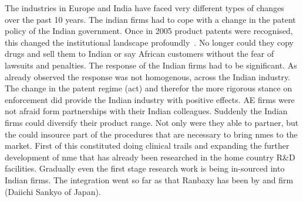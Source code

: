 The \pharma industries in Europe and India have faced very different types of changes over the past 10 years.
The indian firms had to cope with a change in the patent policy of the Indian government.
Once in 2005 product patents were recognised, this changed the institutional landscape profoundly~\citep{Westney:2005vv,Scott:2008tk}.
No longer could they copy drugs and sell them to Indian or say African customers without the fear of lawsuits and penalties.
The response of the Indian firms had to be significant.
As already observed the response was not homogenous, across the Indian industry.
The change in the patent regime (act) and therefor the more rigorous stance on  enforcement did provide the Indian \pharma industry with positive effects.
\Glsdesc{AE} firms were not afraid form partnerships with their Indian colleagues.
Suddenly the Indian firms could diversify their product range. 
Not only were they able to partner, but the could insource part of the procedures that are necessary to bring \glspl{nme} to the market.
First of this constituted doing clinical trails and expanding the further development of \gls{nme} that has already been researched in the home country R\&D facilities.
Gradually even the first stage research work is being in-sourced into Indian \pharma firms.
The integration went so far as that Ranbaxy has been \acq by and  \pharma firm (Daiichi Sankyo of Japan).


